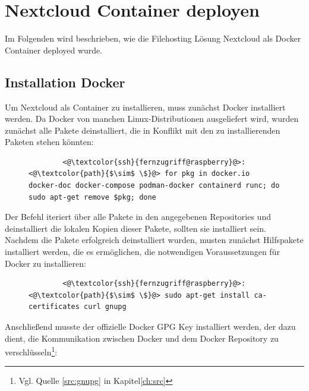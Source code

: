 \documentclass[a4paper, 11pt]{scrartcl}
\begin{document}
\section{Nextcloud Container deployen}
Im Folgenden wird beschrieben, wie die Filehosting Lösung Nextcloud als Docker Container deployed wurde.

\subsection{Installation Docker}
Um Nextcloud als Container zu installieren, muss zunächst Docker installiert werden. Da Docker von manchen Linux-Distributionen
ausgeliefert wird, wurden zunächst alle Pakete deinstalliert, die in Konflikt mit den zu installierenden Paketen stehen könnten:
\begin{figure}[H]
    \begin{mdframed}[backgroundcolor=bbg]
        \begin{lstlisting}
        <@\textcolor{ssh}{fernzugriff@raspberry}@>:<@\textcolor{path}{$\sim$ \$}@> for pkg in docker.io docker-doc docker-compose podman-docker containerd runc; do sudo apt-get remove $pkg; done
        \end{lstlisting}
    \end{mdframed}
    \label{lst:uninstall_docker_pkg}
\end{figure}
Der Befehl iteriert über alle Pakete in den angegebenen Repositories und deinstalliert die lokalen Kopien dieser Pakete, sollten
sie installiert sein.
\\
Nachdem die Pakete erfolgreich deinstalliert wurden, musten zunächst Hilfspakete installiert werden, die es ermöglichen, die
notwendigen Voraussetzungen für Docker zu installieren:
\begin{figure}[H]
    \begin{mdframed}[backgroundcolor=bbg]
        \begin{lstlisting}
        <@\textcolor{ssh}{fernzugriff@raspberry}@>:<@\textcolor{path}{$\sim$ \$}@> sudo apt-get install ca-certificates curl gnupg
        \end{lstlisting}
    \end{mdframed}
    \label{lst:install_https_pkgs}
\end{figure}
Anschließend musste der offizielle Docker GPG Key installiert werden, der dazu dient, die Kommunikation zwischen
Docker und dem Docker Repository zu verschlüsseln\footnote{Vgl. Quelle \ref{src:gnupg} in Kapitel\ref{ch:src}}:
\end{document}

